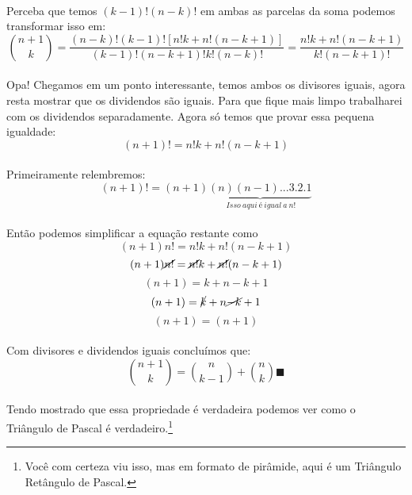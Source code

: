 \documentclass[a4paper,11pt]{book}
\theoremstyle{definition}
\theoremstyle{break}
\begin{document}
\\
Perceba que temos $(k-1)!(n-k)!$ em ambas as parcelas da soma podemos transformar isso em:
\\
$${n+1 \choose k} = \frac{(n-k)!(k-1)![n!k+n!(n-k+1)]}{(k-1)!(n-k+1)!k!(n-k)!} = \frac{n!k + n!(n-k+1)}{k!(n-k+1)!}$$
\\
Opa! Chegamos em um ponto interessante, temos ambos os divisores iguais, agora resta mostrar que os dividendos são iguais. Para que fique mais limpo trabalharei com os dividendos separadamente. Agora só temos que provar essa pequena igualdade:
\\
$$ (n + 1)! = n!k + n!(n - k + 1) $$
\\
Primeiramente relembremos:
\\
$$ (n+1)! = (n+1)\underbrace{(n)(n-1)...3.2.1}_{ \ Isso \ aqui \ é \ igual \ a \ n!} $$
\\
Então podemos simplificar a equação restante como
\\
$$ (n+1)n! = n!k + n!(n-k+1) $$
$$ (n+1)\cancel{n!} = \cancel{n!}k + \cancel{n!}(n-k+1) $$
$$ (n+1) = k + n - k + 1 $$
$$ (n+1) = \cancel{k} + n\cancel{-k}+1 $$
$$ (n+1) = (n+1) $$
\\
Com divisores e dividendos iguais concluímos que:
$$ {n+1 \choose k} = {n \choose k-1} + {n \choose k} \blacksquare$$
\\
Tendo mostrado que essa propriedade é verdadeira podemos ver como o Triângulo de Pascal é verdadeiro.\footnote{Você com certeza viu isso, mas em formato de pirâmide, aqui é um Triângulo Retângulo de Pascal.}
\\
\end{document}
